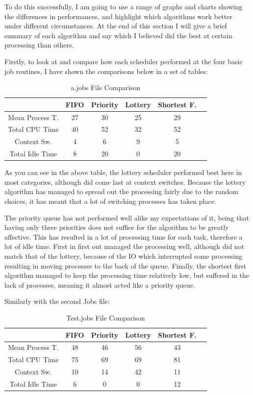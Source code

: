 \documentclass{sig-alternate}
\begin{document}
 To do this successfully, I am going to use a range of graphs and charts showing
the differences in performances, and highlight which algorithms work better
under different circumstances. At the end of this section I will give a brief
summary of each algorithm and say which I believed did the best at certain
processing than others. 
\vspace{3mm}

Firstly, to look at and compare how each scheduler performed at the four basic
job routines, I have shown the comparisons below in a set of tables:
\begin{table}[!h]
\centering
\caption{a.jobs File Comparison}
\begin{tabular}{|c|c|c|c|c|c|} \hline
&FIFO&Priority&Lottery&Shortest F.\\ \hline
Mean Process T.&27&30&25&29\\ \hline
Total CPU Time&40&52&32&52\\ \hline
Context Sw.&4&6&9&5\\ \hline
Total Idle Time&8&20&0&20\\ \hline
\end{tabular}
\end{table}

As you can see in the above table, the lottery scheduler performed best here in
most categories, although did come last at context switches. Because the lottery
algorithm has managed to spread out the processing fairly due to the random
choices, it has meant that a lot of switching processes has taken place. 

The priority queue has not performed well alike my expectations of it, being
that having only three priorities does not suffice for the algorithm to be
greatly affective. This has resulted in a lot of processing time for each task,
therefore a lot of idle time. First in first out managed the processing well,
although did not match that of the lottery, because of the IO which interrupted
some processing resulting in moving processes to the back of the queue. Finally,
the shortest first algorithm managed to keep the processing time relatively low,
but suffered in the lack of processes, meaning it almost acted like a priority
queue.
\vspace{3mm}

Similarly with the second Jobs file:

\begin{table}[!h]
\centering
\caption{Test.jobs File Comparison}
\begin{tabular}{|c|c|c|c|c|c|} \hline
&FIFO&Priority&Lottery&Shortest F.\\ \hline
Mean Process T.&48&46&56&43\\ \hline
Total CPU Time&75&69&69&81\\ \hline
Context Sw.&10&14&42&11\\ \hline
Total Idle Time&6&0&0&12\\ \hline
\end{tabular}
\end{table}
\end{document}
